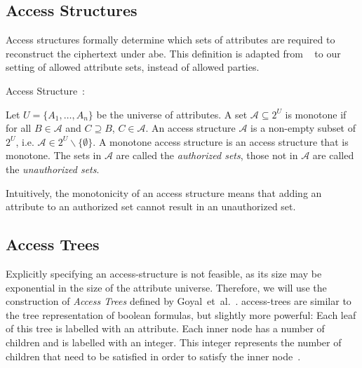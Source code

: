 
\subsection{Access Structures}\label{sec:access-structures}
Access structures formally determine which sets of attributes are required to reconstruct the ciphertext under \acrshort{abe}.
This definition is adapted from \citeauthor{beimel_secure_1996}~\cite{beimel_secure_1996} to our setting of allowed attribute sets, instead of allowed parties.
\begin{definition}Access Structure~\cite{beimel_secure_1996}:

    Let $U = \{A_1, \dots, A_n\}$ be the universe of attributes.
    A set $\mathcal{A} \subseteq 2^{U}$ is monotone if for all $B \in \mathcal{A}$ and $C \supseteq B$,  $C \in \mathcal{A}$.
    An access structure $\mathcal{A}$ is a non-empty subset of $2^U$, i.e. $\mathcal{A} \in 2^U \backslash \{\emptyset\}$. A monotone access structure is an access structure that is monotone.
    The sets in $\mathcal{A}$ are called the \emph{authorized sets}, those not in $\mathcal{A}$ are called the \emph{unauthorized sets}.
\end{definition}

Intuitively, the monotonicity of an access structure means that adding an attribute to an authorized set cannot result in an unauthorized set. 

\subsection{Access Trees}\label{sec:access-trees}



Explicitly specifying an \gls{access-structure} is not feasible, as its size may be exponential in the size of the attribute universe.
Therefore, we will use the construction of \emph{Access Trees} defined by Goyal~et~al.~\cite{goyal_attribute-based_2006}.
\Glspl{access-tree} are similar to the tree representation of boolean formulas, but slightly more powerful:
Each leaf of this tree is labelled with an attribute.
Each inner node has a number of children and is labelled with an integer. 
This integer represents the number of children that need to be satisfied in order to satisfy the inner node~\cite{goyal_attribute-based_2006}.

